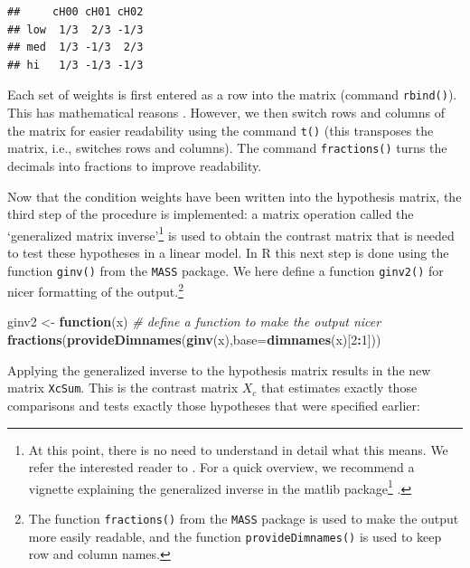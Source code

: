 \documentclass[12pt,]{krantz}
\newenvironment{Shaded}{\begin{snugshade}}{\end{snugshade}}
\newcommand{\KeywordTok}[1]{\textcolor[rgb]{0.13,0.29,0.53}{\textbf{#1}}}
\newcommand{\DataTypeTok}[1]{\textcolor[rgb]{0.13,0.29,0.53}{#1}}
\newcommand{\DecValTok}[1]{\textcolor[rgb]{0.00,0.00,0.81}{#1}}
\newcommand{\StringTok}[1]{\textcolor[rgb]{0.31,0.60,0.02}{#1}}
\newcommand{\CommentTok}[1]{\textcolor[rgb]{0.56,0.35,0.01}{\textit{#1}}}
\newcommand{\ControlFlowTok}[1]{\textcolor[rgb]{0.13,0.29,0.53}{\textbf{#1}}}
\newcommand{\OperatorTok}[1]{\textcolor[rgb]{0.81,0.36,0.00}{\textbf{#1}}}
\newcommand{\NormalTok}[1]{#1}
\renewcommand{\href}[2]{#2\footnote{\url{#1}}}
\theoremstyle{definition}
\theoremstyle{definition}
\theoremstyle{definition}
\theoremstyle{remark}
\begin{document}
\begin{verbatim}
##     cH00 cH01 cH02
## low  1/3  2/3 -1/3
## med  1/3 -1/3  2/3
## hi   1/3 -1/3 -1/3
\end{verbatim}

Each set of weights is first entered as a row into the matrix (command
\texttt{rbind()}). This has mathematical reasons
\citep[see][]{schad2020capitalize}. However, we then switch rows and
columns of the matrix for easier readability using the command
\texttt{t()} (this transposes the matrix, i.e., switches rows and
columns). The command \texttt{fractions()} turns the decimals into
fractions to improve readability.

Now that the condition weights have been written into the hypothesis
matrix, the third step of the procedure is implemented: a matrix
operation called the `generalized matrix inverse'\footnote{At this
  point, there is no need to understand in detail what this means. We
  refer the interested reader to \citet{schad2020capitalize}. For a
  quick overview, we recommend a vignette explaining the generalized
  inverse in the
  \href{https://cran.r-project.org/web/packages/matlib/vignettes/ginv.html}{matlib
  package} \citep{friendly_matlib}.} is used to obtain the contrast
matrix that is needed to test these hypotheses in a linear model. In R
this next step is done using the function \texttt{ginv()} from the
\texttt{MASS} package. We here define a function \texttt{ginv2()} for
nicer formatting of the output.\footnote{The function
  \texttt{fractions()} from the \texttt{MASS} package is used to make
  the output more easily readable, and the function
  \texttt{provideDimnames()} is used to keep row and column names.}

\begin{Shaded}
\begin{Highlighting}[]
\NormalTok{ginv2 <-}\StringTok{ }\ControlFlowTok{function}\NormalTok{(x) }\CommentTok{# define a function to make the output nicer}
  \KeywordTok{fractions}\NormalTok{(}\KeywordTok{provideDimnames}\NormalTok{(}\KeywordTok{ginv}\NormalTok{(x),}\DataTypeTok{base=}\KeywordTok{dimnames}\NormalTok{(x)[}\DecValTok{2}\OperatorTok{:}\DecValTok{1}\NormalTok{]))}
\end{Highlighting}
\end{Shaded}

Applying the generalized inverse to the hypothesis matrix results in the
new matrix \texttt{XcSum}. This is the contrast matrix \(X_c\) that
estimates exactly those comparisons and tests exactly those hypotheses
that were specified earlier:
\end{document}
